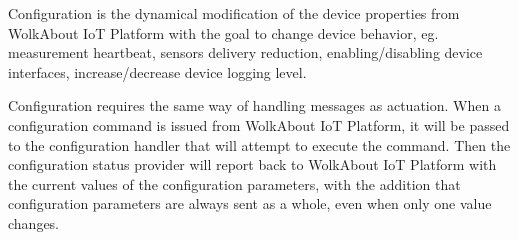Configuration is the dynamical modification of the device properties from Wolk\+About IoT Platform with the goal to change device behavior, eg. measurement heartbeat, sensors delivery reduction, enabling/disabling device interfaces, increase/decrease device logging level.

Configuration requires the same way of handling messages as actuation. When a configuration command is issued from Wolk\+About IoT Platform, it will be passed to the configuration handler that will attempt to execute the command. Then the configuration status provider will report back to Wolk\+About IoT Platform with the current values of the configuration parameters, with the addition that configuration parameters are always sent as a whole, even when only one value changes. 

 